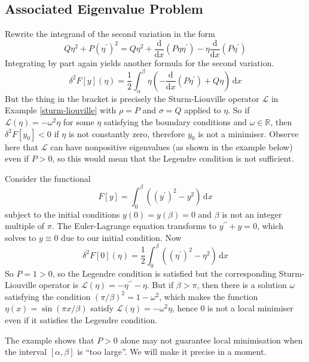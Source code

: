 \subsection{Associated Eigenvalue Problem}
Rewrite the integrand of the second variation in the form
$$Q\eta^2+P(\eta^\prime)^2=Q\eta^2+\frac{\mathrm d}{\mathrm dx}(P\eta\eta^\prime)-\eta\frac{\mathrm d}{\mathrm dx}(P\eta^\prime)$$
Integrating by part again yields another formula for the second variation.
$$\delta^2F[y](\eta)=\frac{1}{2}\int_\alpha^\beta\eta\left( -\frac{\mathrm d}{\mathrm dx}(P\eta^\prime)+ Q\eta\right)\,\mathrm dx$$
But the thing in the bracket is precisely the Sturm-Liouville operator $\mathcal L$ in Example \ref{sturm-liouville} with $\rho=P$ and $\sigma=Q$ applied to $\eta$.
So if $\mathcal L(\eta)=-\omega^2\eta$ for some $\eta$ satisfying the boundary conditions and $\omega\in\mathbb R$, then $\delta^2F[y_0]<0$ if $\eta$ is not constantly zero, therefore $y_0$ is not a minimiser.
Observe here that $\mathcal L$ can have nonpositive eigenvalues (as shown in the example below) even if $P>0$, so this would mean that the Legendre condition is not sufficient.
\begin{example}
    Consider the functional
    $$F[y]=\int_0^\beta((y^\prime)^2-y^2)\,\mathrm dx$$
    subject to the initial conditions $y(0)=y(\beta)=0$ and $\beta$ is not an integer multiple of $\pi$.
    The Euler-Lagrange equation transforms to $y^{\prime\prime}+y=0$, which solves to $y\equiv 0$ due to our initial condition.
    Now
    $$\delta^2F[0](\eta)=\frac{1}{2}\int_0^\beta((\eta^\prime)^2-\eta^2)\,\mathrm dx$$
    So $P=1>0$, so the Legendre condition is satisfied but the corresponding Sturm-Liouville operator is $\mathcal L(\eta)=-\eta^{\prime\prime}-\eta$.
    But if $\beta>\pi$, then there is a solution $\omega$ satisfying the condition $(\pi/\beta)^2=1-\omega^2$, which makes the function $\eta(x)=\sin(\pi x/\beta)$ satisfy $\mathcal L(\eta)=-\omega^2\eta$, hence $0$ is not a local minimiser even if it satisfies the Legendre condition.
\end{example}
The example shows that $P>0$ alone may not guarantee local minimisation when the interval $[\alpha,\beta]$ is ``too large''.
We will make it precise in a moment.
